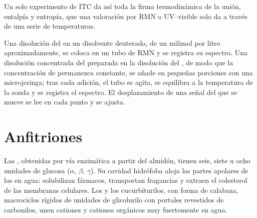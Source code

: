 Un solo experimento de ITC da así toda la firma termodinámica de la
unión, entalpía y entropía, que una valoración por RMN o UV--visible solo da
a través de una serie de temperaturas.

\begin{inthelab}
Una disolución del  en un disolvente deuterado, de un milimol por litro aproximadamente,
se coloca en un tubo de RMN y se registra su espectro. Una disolución concentrada del
 preparada en la disolución del , de modo que la concentración de  permanezca
constante, se añade en pequeñas porciones con una microjeringa; tras cada adición, el
tubo se agita, se equilibra a la temperatura de la sonda y se registra el
espectro. El desplazamiento de una señal del  que se mueve se lee en cada punto y se
ajusta.
\end{inthelab}

\section{Anfitriones}

Las , obtenidas por vía enzimática a partir del almidón, tienen seis, siete u ocho unidades
de glucosa ($\alpha$, $\beta$, $\gamma$). Su cavidad hidrófoba aloja las partes apolares de los  en
agua: solubilizan fármacos, transportan fragancias y extraen el colesterol de las
membranas celulares. Los  y los cucurbiturilos, con forma de calabaza, macrociclos
rígidos de unidades de glicolurilo con portales revestidos de carbonilos, unen cationes y
cationes orgánicos muy fuertemente en agua.

